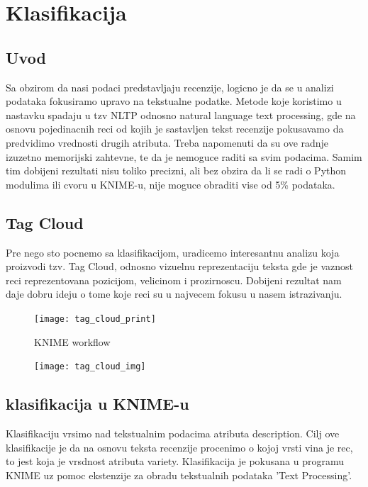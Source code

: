 \documentclass[11pt]{article} %
\begin{document}
	\newpage
	\section{Klasifikacija}
\subsection{Uvod}
Sa obzirom da nasi podaci predstavljaju recenzije, logicno je da se u analizi podataka fokusiramo upravo na tekstualne podatke.
Metode koje koristimo u nastavku spadaju u tzv NLTP odnosno natural language text processing, gde na osnovu pojedinacnih reci 
od kojih je sastavljen tekst recenzije pokusavamo da predvidimo vrednosti drugih atributa. Treba napomenuti da su ove radnje 
izuzetno memorijski zahtevne, te da je nemoguce raditi sa svim podacima. Samim tim dobijeni rezultati nisu toliko precizni,
ali bez obzira da li se radi o Python modulima ili cvoru u KNIME-u, nije moguce obraditi vise od 5\% podataka.
\subsection{Tag Cloud}
Pre nego sto pocnemo sa klasifikacijom, uradicemo interesantnu analizu koja proizvodi tzv. Tag Cloud, odnosno vizuelnu reprezentaciju 
teksta gde je vaznost reci reprezentovana pozicijom, velicinom i prozirnoscu. Dobijeni rezultat nam daje dobru ideju o tome koje reci su 
u najvecem fokusu u nasem istrazivanju.
\begin{figure}[h!]
	\centering
		\texttt{[image: tag\_cloud\_print]}
		\caption{KNIME workflow}
	\end{figure}
\begin{figure}[h!]
	\centering
		\texttt{[image: tag\_cloud\_img]}
	\end{figure}
	
	\newpage
\subsection{klasifikacija u KNIME-u}
Klasifikaciju vrsimo nad tekstualnim podacima atributa description. Cilj ove klasifikacije je da na osnovu teksta recenzije
procenimo o kojoj vrsti vina je rec, to jest koja je vrsdnost atributa variety. Klasifikacija je pokusana u programu KNIME uz pomoc
ekstenzije za obradu tekstualnih podataka 'Text Processing'.\newline
\end{document}
